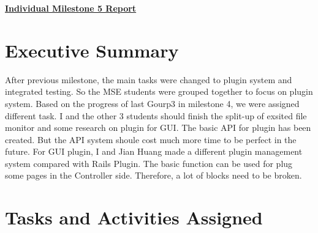 \documentclass{article}
\begin{document}
\pagestyle{headings}

\begin{center}
{\LARGE\textbf{\underline{{Individual Milestone 5 Report}}}}
\end{center}

\section*{Executive Summary}

After previous milestone, the main tasks were changed to plugin system and integrated testing. So the MSE students were grouped together to focus on plugin system. Based on the progress of last Gourp3 in milestone 4, we were assigned different task. I and the other 3 students should finish the split-up of exsited file monitor and some research on plugin for GUI. The basic API for plugin has been created. But the API system shoule cost much more time to be perfect in the future. For GUI plugin, I and Jian Huang made a different plugin management system compared with Rails Plugin. The basic function can be used for plug some pages in the Controller side. Therefore, a lot of blocks need to be broken.

\section*{Tasks and Activities Assigned}
\end{document}
